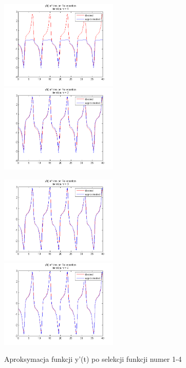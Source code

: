 \begin{figure}[ht!]
	\centering
	
	\subfloat
	{\includegraphics[width=0.5\textwidth]
	{images/deriv_iter1.png}}
	\subfloat
	{\includegraphics[width=0.5\textwidth]
	{images/deriv_iter2.png}}
	
	\subfloat
	{\includegraphics[width=0.5\textwidth]
	{images/deriv_iter3.png}}
	\subfloat
	{\includegraphics[width=0.5\textwidth]
	{images/deriv_iter4.png}}

	\caption{Aproksymacja funkcji y'(t)  po selekcji funkcji numer 1-4}		
	\label{fig:deriv_approx_a}
\end{figure}

